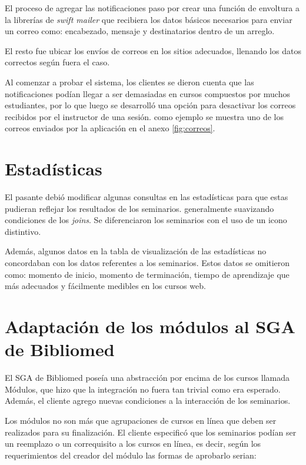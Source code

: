 	El proceso de agregar las notificaciones paso por crear una función de envoltura a la librerías de \emph{swift mailer} que recibiera los datos básicos necesarios para enviar un correo como: encabezado, mensaje y destinatarios dentro de un arreglo.

	El resto fue ubicar los envíos de correos en los sitios adecuados, llenando los datos correctos según fuera el caso.

	Al comenzar a probar el sistema, los clientes se dieron cuenta que las notificaciones podían llegar a ser demasiadas en cursos compuestos por muchos estudiantes, por lo que luego se desarrolló una opción para desactivar los correos recibidos por el instructor de una sesión. como ejemplo se muestra uno de los correos enviados por la aplicación en el anexo \ref{fig:correos}.

	\section{Estadísticas} %
	\label{sec:estadisticas}
	
	El pasante debió modificar algunas consultas en las estadísticas para que estas pudieran reflejar los resultados de los seminarios. generalmente suavizando condiciones de los \emph{joins}. Se diferenciaron los seminarios con el uso de un icono distintivo.

	Además, algunos datos en la tabla de visualización de las estadísticas no concordaban con los datos referentes a los seminarios. Estos datos se omitieron como: momento de inicio, momento de terminación, tiempo de aprendizaje que más adecuados y fácilmente medibles en los cursos web.

	\section{Adaptación de los módulos al SGA de Bibliomed} %
	\label{sec:adaptacion_de_los_modulos_al_sga_de_bibliomed}
	
	El SGA de Bibliomed poseía una abstracción por encima de los cursos llamada Módulos, que hizo que la integración no fuera tan trivial como era esperado. Además, el cliente agrego nuevas condiciones a la interacción de los seminarios.

	Los módulos no son más que agrupaciones de cursos en línea que deben ser realizados para su finalización. El cliente especificó que los seminarios podían ser un reemplazo o un correquisito a los cursos en línea, es decir, según los requerimientos del creador del módulo las formas de aprobarlo serian:

